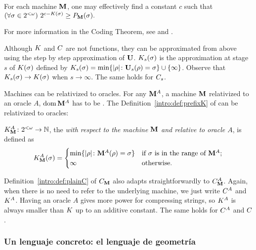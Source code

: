 \begin{teorema}\label{intro:thm:coding} For each \pfree machine ${\bf M}$, one
may effectively find a constant $c$ such that $ (\forall
\sigma\in2^{<\omega})\ 2^{c-K(\sigma)}\geq P_{{\bf M}}(\sigma). $
\end{teorema}
For more information in the Coding Theorem, see \cite{LV97} and
\cite{DHBook}.

\bigskip

 Although $K$ and $C$ are not \comp functions,
they can be \recly approximated from above using the step by step
approximation of ${\bf U}$. $K_s(\sigma)$ is the
approximation at stage $s$ of $K(\sigma)$ defined by
$K_s(\sigma)=\min\{| \rho |\colon
{\bf U}_s(\rho)=\sigma\}\cup\{\infty\}$. Observe that
$K_s(\sigma)\to K(\sigma)$ when $s\to\infty$.
 The same holds for
${C_s}$.


Machines can be relativized to oracles. For any ${\bf M}^A$, a \pfree
machine ${\bf M}$ relativized to an oracle $A$, $\domain {\M^A}$ has to
be \pfree. The Definition~\ref{intro:def:prefixK} of \kolcomp can
be relativized to oracles:

\begin{definicion}\label{intro:def:prefixKwithOracle}
$K_{{\bf M}}^A\colon2^{<\omega} \to \mathbb{N}$, the {\em \pfree
\kolcomp with respect to the \pfree machine ${\bf M}$ and relative to
oracle $A$}, is defined as
$$
K_{{\bf M}}^A(\sigma)=
    \begin{cases}
    \min \{| \rho |\colon {\bf M}^A(\rho)=\sigma \} & \textrm{if $\sigma$ is in the range of ${\bf M}^A$};\\
    \infty & \textrm{otherwise.}
    \end{cases}
$$
\end{definicion}

Definition~\ref{intro:def:plainC} of $C_{{\bf M}}$ also adapts
straightforwardly to $C_{{\bf M}}^A$. Again, when there
is no need to refer to the underlying \opt machine, we just write
$C^A$ and $K^A$. Having an
oracle $A$ gives more power for compressing strings, so $K^A$ is
always smaller than $K$ up to an additive constant. The same
holds for $C^A$ and $C$.




\subsubsection{Un lenguaje concreto: el lenguaje de geometría}

